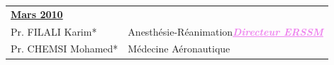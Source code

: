 \begin{table}[H]

  \begin{tabular}{l l}
   \multicolumn{2}{l}{\textbf{\underline{Mars 2010}}}\vspace*{0.5em}\\

   Pr. FILALI Karim* & \hspace*{2em} Anesthésie-Réanimation\textcolor{violet}{\textbf{\emph{\underline{Directeur ERSSM}}}} \\       
   Pr. CHEMSI Mohamed* & \hspace*{2em} Médecine Aéronautique\\
 


  \end{tabular}
    
\end{table}

